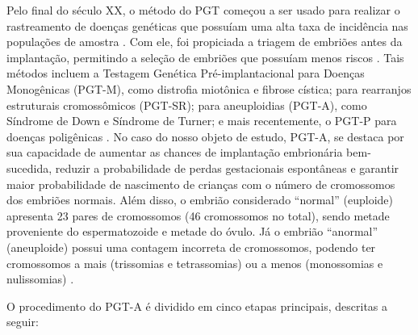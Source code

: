 Pelo final do século XX, o método do PGT começou a ser usado para realizar o rastreamento de doenças genéticas que possuíam uma alta taxa de incidência nas populações de amostra \cite{yang2024}. Com ele, foi propiciada a triagem de embriões antes da implantação, permitindo a seleção de embriões que possuíam menos riscos \cite{scienceofbiogenetics2024}. Tais métodos incluem a Testagem Genética Pré-implantacional para Doenças Monogênicas (PGT-M), como distrofia miotônica e fibrose cística; para rearranjos estruturais cromossômicos (PGT-SR); para aneuploidias (PGT-A), como Síndrome de Down e Síndrome de Turner; e mais recentemente, o PGT-P para doenças poligênicas \cite{yang2024}. No caso do nosso objeto de estudo, PGT-A, se destaca por sua capacidade de aumentar as chances de implantação embrionária bem-sucedida, reduzir a probabilidade de perdas gestacionais espontâneas e garantir maior probabilidade de nascimento de crianças com o número de cromossomos dos embriões normais\cite{yang2024}. Além disso, o embrião considerado “normal” (euploide) apresenta 23 pares de cromossomos (46 cromossomos no total), sendo metade proveniente do espermatozoide e metade do óvulo. Já o embrião “anormal” (aneuploide) possui uma contagem incorreta de cromossomos, podendo ter cromossomos a mais (trissomias e tetrassomias) ou a menos (monossomias e nulissomias) \cite{cnyfertility2024}. 

O procedimento do PGT-A é dividido em cinco etapas principais, descritas a seguir:

